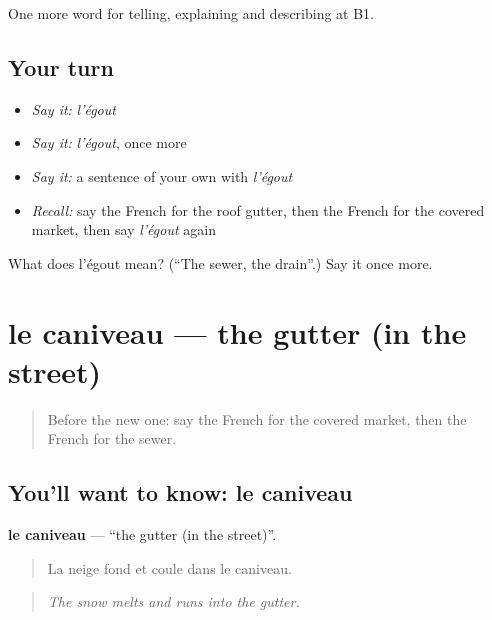 \begin{grammarlens}[title={What you've built}]
One more word for telling, explaining and describing at B1.
\end{grammarlens}

\subsection*{Your turn}
\begin{itemize}
\raggedright
  \item \emph{Say it:} \emph{l'égout}
  \item \emph{Say it:} \emph{l'égout}, once more
  \item \emph{Say it:} a sentence of your own with \emph{l'égout}
  \item \emph{Recall:} say the French for the roof gutter, then the French for the covered market, then say \emph{l'égout} again
\end{itemize}

\begin{tcolorbox}[breakable,colback=teal!4,colframe=teal!35!black,title={Before you move on}]
What does l'égout mean? (\textquotedblleft{}The sewer, the drain\textquotedblright{}.) Say it once more.
\end{tcolorbox}
\section[le caniveau]{le caniveau — the gutter (in the street)}

\label{lesson:FR-C443-caniveau}



\begin{quote}
Before the new one: say the French for the covered market, then the French for the sewer.
\end{quote}

\subsection*{You'll want to know: le caniveau}
\textbf{le caniveau} — \textquotedblleft{}the gutter (in the street)\textquotedblright{}.

\begin{quote}
La neige fond et coule dans le caniveau.
\end{quote}

\begin{quote}
\emph{The snow melts and runs into the gutter.}
\end{quote}

